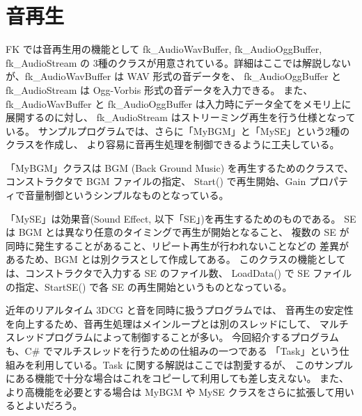 \section{音再生}

FK では音再生用の機能として fk\_AudioWavBuffer, fk\_AudioOggBuffer, fk\_AudioStream の
3種のクラスが用意されている。詳細はここでは解説しないが、fk\_AudioWavBuffer は WAV 形式の音データを、
fk\_AudioOggBuffer と fk\_AudioStream は Ogg-Vorbis 形式の音データを入力できる。
また、fk\_AudioWavBuffer と fk\_AudioOggBuffer は入力時にデータ全てをメモリ上に展開するのに対し、
fk\_AudioStream はストリーミング再生を行う仕様となっている。
サンプルプログラムでは、さらに「MyBGM」と「MySE」という2種のクラスを作成し、
より容易に音再生処理を制御できるように工夫している。

「MyBGM」クラスは BGM (Back Ground Music) を再生するためのクラスで、
コンストラクタで BGM ファイルの指定、
Start() で再生開始、Gain プロパティで音量制御というシンプルなものとなっている。

「MySE」は効果音(Sound Effect, 以下「SE」)を再生するためのものである。
SE は BGM とは異なり任意のタイミングで再生が開始となること、
複数の SE が同時に発生することがあること、リピート再生が行われないことなどの
差異があるため、BGM とは別クラスとして作成してある。
このクラスの機能としては、コンストラクタで入力する SE のファイル数、
LoadData() で SE ファイルの指定、StartSE() で各 SE の再生開始というものとなっている。

近年のリアルタイム 3DCG と音を同時に扱うプログラムでは、
音再生の安定性を向上するため、音再生処理はメインループとは別のスレッドにして、
マルチスレッドプログラムによって制御することが多い。
今回紹介するプログラムも、C\# でマルチスレッドを行うための仕組みの一つである
「Task」という仕組みを利用している。Task に関する解説はここでは割愛するが、
このサンプルにある機能で十分な場合はこれをコピーして利用しても差し支えない。
また、より高機能を必要とする場合は MyBGM や MySE クラスをさらに拡張して用いるとよいだろう。
\\ ~

